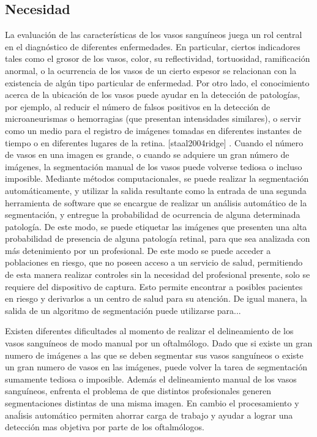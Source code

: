 
\subsection{Necesidad}
La evaluaci\'on de las caracter\'isticas de los vasos sangu\'ineos  juega un  rol central en el diagn\'ostico de diferentes enfermedades. En particular, ciertos indicadores tales como el grosor de los vasos, color, su reflectividad, tortuosidad, ramificaci\'on anormal, o la ocurrencia de los vasos de un cierto espesor  se relacionan con la existencia de algún tipo particular de enfermedad.
Por otro lado, el conocimiento acerca de la ubicación de los vasos puede ayudar
en la detección de patologías, por ejemplo, al reducir el número de falsos positivos
en la detección de microaneurismas o hemorragias (que presentan intensidades similares), o servir como un medio para el registro de imágenes
tomadas en diferentes instantes de tiempo o en diferentes lugares de la retina.
[staal2004ridge] .
Cuando el n\'umero de vasos en una imagen es grande, o cuando se adquiere un gran n\'umero de im\'agenes, la segmentaci\'on manual de los vasos puede volverse tediosa o incluso imposible. 
Mediante m\'etodos computacionales, se puede realizar la segmentación autom\'aticamente, y utilizar la salida resultante como la entrada de una segunda herramienta de software que se encargue de  realizar un an\'alisis autom\'atico de la segmentaci\'on, y entregue la probabilidad de ocurrencia de alguna determinada patolog\'ia. De este modo, se puede etiquetar las im\'agenes que presenten una alta  probabilidad de presencia de alguna patolog\'ia retinal, para que sea analizada con m\'as detenimiento por un profesional. De este modo se puede acceder a poblaciones en riesgo, que no poseen acceso a un servicio de salud, permitiendo de esta manera realizar controles sin la necesidad del profesional presente, solo se requiere del dispositivo de captura. Esto permite encontrar a posibles pacientes en riesgo y derivarlos a un centro de salud para su atenci\'on. De igual manera, la salida de un algoritmo de segmentaci\'on puede utilizarse para...


Existen diferentes dificultades al momento de realizar el delineamiento de los vasos sangu\'ineos de modo manual por un oftalm\'ologo. Dado que si existe un gran numero de im\'agenes a las que se deben segmentar sus vasos sangu\'ineos o existe un gran numero de vasos en las im\'agenes, puede volver la tarea de segmentaci\'on sumamente tediosa o imposible. Adem\'as el delineamiento manual de los vasos sangu\'ineos, enfrenta el problema de que distintos profesionales generen segmentaciones distintas de una misma imagen. En cambio el procesamiento y ana\'lisis autom\'atico permiten ahorrar carga de trabajo y ayudar a lograr una detecci\'on mas objetiva por parte de los oftalm\'ologos. 

